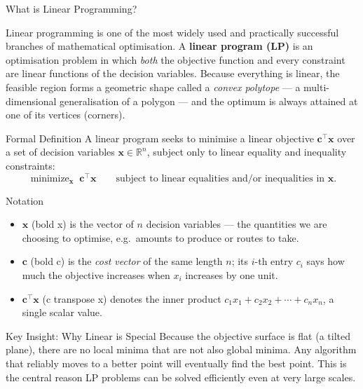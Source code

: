 \documentclass[aspectratio=169,10pt]{beamer}
\DeclareMathOperator*{\minimize}{minimize}
\newcommand{\xv}{\mathbf{x}}
\newcommand{\cv}{\mathbf{c}}
\begin{document}
\begin{frame}[allowframebreaks]{What is Linear Programming?}

Linear programming is one of the most widely used and practically successful branches
of mathematical optimisation.  A \textbf{linear program (LP)} is an optimisation problem
in which \emph{both} the objective function and every constraint are linear functions
of the decision variables.  Because everything is linear, the feasible region forms a
geometric shape called a \emph{convex polytope} --- a multi-dimensional generalisation
of a polygon --- and the optimum is always attained at one of its vertices (corners).

\begin{block}{Formal Definition}
A linear program seeks to minimise a linear objective $\cv^\top\xv$ over a set of
decision variables $\xv \in \mathbb{R}^n$, subject only to linear equality and
inequality constraints:
\[
  \minimize_{\xv}\; \cv^\top\xv
  \qquad
  \text{subject to linear equalities and/or inequalities in }\xv.
\]
\end{block}

\begin{block}{Notation}
\begin{itemize}
  \item $\xv$ (bold x) is the vector of $n$ decision variables --- the quantities we
        are choosing to optimise, e.g.\ amounts to produce or routes to take.
  \item $\cv$ (bold c) is the \emph{cost vector} of the same length $n$; its $i$-th
        entry $c_i$ says how much the objective increases when $x_i$ increases by one unit.
  \item $\cv^\top\xv$ (c transpose x) denotes the inner product
        $c_1 x_1 + c_2 x_2 + \cdots + c_n x_n$, a single scalar value.
\end{itemize}
\end{block}

\begin{alertblock}{Key Insight: Why Linear is Special}
Because the objective surface is flat (a tilted plane), there are no local minima that
are not also global minima.  Any algorithm that reliably moves to a better point will
eventually find the best point.  This is the central reason LP problems can be solved
efficiently even at very large scales.
\end{alertblock}

\framebreak


\end{frame}
\end{document}
